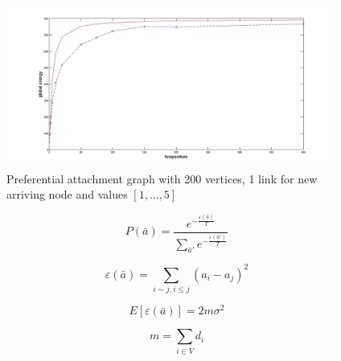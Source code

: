 \documentclass[12pt]{report}
\begin{document}
\begin{figure}[ht]
    \centering
    \includegraphics[height=200px]{pa200x1}
    \caption{ Preferential attachment graph with 200 vertices, 1 link for new arriving node and values $[1, ..., 5]$ }
\end{figure}


$$ P(\bar{a}) = \frac{ e^{-\frac{ \varepsilon (\bar{a})}{T}} }{ \sum\limits_{\bar{a}'} e^{-\frac{\varepsilon(\bar{a}')}{T}}} $$

$$ \varepsilon (\bar{a}) =  \sum\limits_{i \sim j, i \leq j} (a_i - a_j)^2  $$


$$ E[\varepsilon (\bar{a})] = 2m \sigma^2$$

$$ m = \sum_{i \in V} d_i$$
\end{document}
